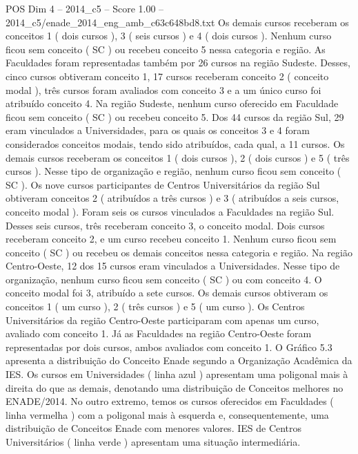 \begin{textsample}{POS Dim 4 – 2014\_c5 – Score 1.00 – 2014\_c5/enade\_2014\_eng\_amb\_c63c648bd8.txt}
Os demais cursos receberam os conceitos 1 ( dois cursos ), 3 ( seis cursos ) e 4 ( dois cursos ).
Nenhum curso ficou sem conceito ( SC ) ou recebeu conceito 5 nessa categoria e região.
As Faculdades foram representadas também por 26 cursos na região Sudeste.
Desses, cinco cursos obtiveram conceito 1, 17 cursos receberam conceito 2 ( conceito modal ), três cursos foram avaliados com conceito 3 e a um único curso foi atribuído conceito 4.
Na região Sudeste, nenhum curso oferecido em Faculdade ficou sem conceito ( SC ) ou recebeu conceito 5.
Dos 44 cursos da região Sul, 29 eram vinculados a Universidades, para os quais os conceitos 3 e 4 foram considerados conceitos modais, tendo sido atribuídos, cada qual, a 11 cursos.
Os demais cursos receberam os conceitos 1 ( dois cursos ), 2 ( dois cursos ) e 5 ( três cursos ).
Nesse tipo de organização e região, nenhum curso ficou sem conceito ( SC ).
Os nove cursos participantes de Centros Universitários da região Sul obtiveram conceitos 2 ( atribuídos a três cursos ) e 3 ( atribuídos a seis cursos, conceito modal ).
Foram seis os cursos vinculados a Faculdades na região Sul.
Desses seis cursos, três receberam conceito 3, o conceito modal.
Dois cursos receberam conceito 2, e um curso recebeu conceito 1.
Nenhum curso ficou sem conceito ( SC ) ou recebeu os demais conceitos nessa categoria e região.
Na região Centro-Oeste, 12 dos 15 cursos eram vinculados a Universidades.
Nesse tipo de organização, nenhum curso ficou sem conceito ( SC ) ou com conceito 4.
O conceito modal foi 3, atribuído a sete cursos.
Os demais cursos obtiveram os conceitos 1 ( um curso ), 2 ( três cursos ) e 5 ( um curso ).
Os Centros Universitários da região Centro-Oeste participaram com apenas um curso, avaliado com conceito 1.
Já as Faculdades na região Centro-Oeste foram representadas por dois cursos, ambos avaliados com conceito 1.
O Gráfico 5.3 apresenta a distribuição do Conceito Enade segundo a Organização Acadêmica da IES.
Os cursos em Universidades ( linha azul ) apresentam uma poligonal mais à direita do que as demais, denotando uma distribuição de Conceitos melhores no ENADE/2014.
No outro extremo, temos os cursos oferecidos em Faculdades ( linha vermelha ) com a poligonal mais à esquerda e, consequentemente, uma distribuição de Conceitos Enade com menores valores.
IES de Centros Universitários ( linha verde ) apresentam uma situação intermediária.

\end{textsample}
